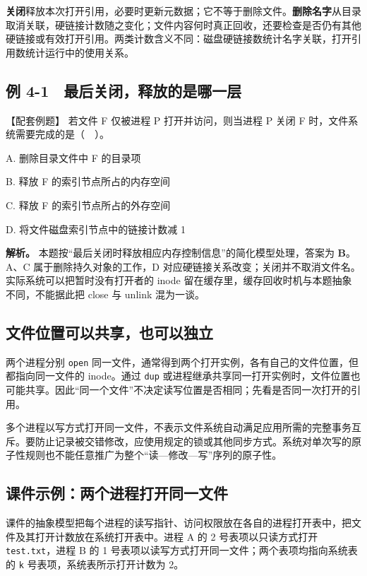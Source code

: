 \textbf{关闭}释放本次打开引用，必要时更新元数据；它不等于删除文件。\textbf{删除名字}从目录取消关联，硬链接计数随之变化；文件内容何时真正回收，还要检查是否仍有其他硬链接或有效打开引用。两类计数含义不同：磁盘硬链接数统计名字关联，打开引用数统计运行中的使用关系。

\subsection{例 4-1　最后关闭，释放的是哪一层}\label{OS04-ex6-1}

\begin{example}[配套例题]

【配套例题】 若文件 F 仅被进程 P 打开并访问，则当进程 P 关闭 F 时，文件系统需要完成的是（　）。

A. 删除目录文件中 F 的目录项

B. 释放 F 的索引节点所占的内存空间

C. 释放 F 的索引节点所占的外存空间

D. 将文件磁盘索引节点中的链接计数减 1

\end{example}

\textbf{解析。} 本题按``最后关闭时释放相应内存控制信息''的简化模型处理，答案为 \textbf{B}。A、C 属于删除持久对象的工作，D 对应硬链接关系改变；关闭并不取消文件名。实际系统可以把暂时没有打开者的 inode 留在缓存里，缓存回收时机与本题抽象不同，不能据此把 close 与 unlink 混为一谈。

\subsection{文件位置可以共享，也可以独立}\label{OS04-auto-1}

两个进程分别 \texttt{open} 同一文件，通常得到两个打开实例，各有自己的文件位置，但都指向同一文件的 inode。通过 \texttt{dup} 或进程继承共享同一打开实例时，文件位置也可能共享。因此``同一个文件''不决定读写位置是否相同；先看是否同一次打开的引用。

多个进程以写方式打开同一文件，不表示文件系统自动满足应用所需的完整事务互斥。要防止记录被交错修改，应使用规定的锁或其他同步方式。系统对单次写的原子性规则也不能任意推广为整个``读---修改---写''序列的原子性。

\subsection{课件示例：两个进程打开同一文件}\label{OS04-course-shared-open}

课件的抽象模型把每个进程的读写指针、访问权限放在各自的进程打开表中，把文件及其打开计数放在系统打开表中。进程 A 的 2 号表项以只读方式打开 \texttt{test.\allowbreak{}txt}，进程 B 的 1 号表项以读写方式打开同一文件；两个表项均指向系统表的 \texttt{k} 号表项，系统表所示打开计数为 2。


